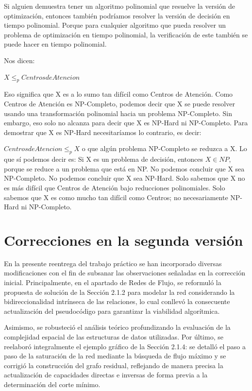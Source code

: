 \documentclass[12pt]{article}
\begin{document}
            Si alguien demuestra tener un algoritmo polinomial que resuelve la versión de optimización, entonces también podríamos resolver la versión de decisión en tiempo polinomial. Porque para cualquier algoritmo que pueda resolver un problema de optimización en tiempo polinomial, la verificación de este también se puede hacer en tiempo polinomial.

            Nos dicen:
            \begin{center}
                $X \leq_p Centros de Atencion$
            \end{center}
            
Eso significa que X es a lo sumo tan difícil como Centros de Atención. Como Centros de Atención es NP-Completo, podemos decir que X se puede resolver usando una transformación polinomial hacia un problema NP-Completo. Sin embargo, eso solo no alcanza para decir que X es NP-Hard ni NP-Completo.
Para demostrar que X es NP-Hard necesitaríamos lo contrario, es decir:

$Centros de Atencion \leq_p X$
o que algún problema NP-Completo se reduzca a X.
Lo que sí podemos decir es: Si X es un problema de decisión, entonces $X \in NP$, porque se reduce a un problema que está en NP. No podemos concluir que X sea NP-Completo. No podemos concluir que X sea NP-Hard. Solo sabemos que X no es más difícil que Centros de Atención bajo reducciones polinomiales. Solo sabemos que X es como mucho tan difícil como Centros; no necesariamente NP-Hard ni NP-Completo.

    \section{Correcciones en la segunda versión}

        En la presente reentrega del trabajo práctico se han incorporado diversas modificaciones con el fin de subsanar las observaciones señaladas en la corrección inicial. Principalmente, en el apartado de Redes de Flujo, se reformuló la propuesta de solución de la Sección 2.1.2 para modelar la red considerando la bidireccionalidad intrínseca de las relaciones, lo cual conllevó la consecuente actualización del pseudocódigo para garantizar la viabilidad algorítmica. 
        
        Asimismo, se robusteció el análisis teórico profundizando la evaluación de la complejidad espacial de las estructuras de datos utilizadas. Por último, se reelaboró integralmente el ejemplo gráfico de la Sección 2.1.4: se detalló el paso a paso de la saturación de la red mediante la búsqueda de flujo máximo y se corrigió la construcción del grafo residual, reflejando de manera precisa la actualización de capacidades directas e inversas de forma previa a la determinación del corte mínimo.
\end{document}
